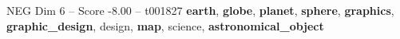 \begin{textsample}{NEG Dim 6 – Score -8.00 – t001827}  \label{ex:f6_neg_035}
\textbf{earth}, \textbf{globe}, \textbf{planet}, \textbf{sphere}, \textbf{graphics}, \textbf{graphic\_design}, design, \textbf{map}, science, \textbf{astronomical\_object}

\end{textsample}
